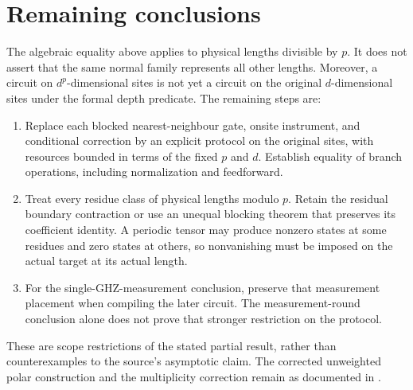 \documentclass{article}
\begin{document}
\section{Remaining conclusions}
The algebraic equality above applies to physical lengths divisible by
$p$. It does not assert that the same normal family represents all
other lengths. Moreover, a circuit on $d^p$-dimensional sites is not yet
a circuit on the original $d$-dimensional sites under the formal depth
predicate. The remaining steps are:
\begin{enumerate}
    \item Replace each blocked nearest-neighbour gate, onsite
          instrument, and conditional correction by an explicit
          protocol on the original sites, with resources bounded in
          terms of the fixed $p$ and $d$. Establish equality of branch
          operations, including normalization and feedforward.
    \item Treat every residue class of physical lengths modulo $p$.
          Retain the residual boundary contraction or use an unequal
          blocking theorem that preserves its coefficient identity.
          A periodic tensor may produce nonzero states at some
          residues and zero states at others, so nonvanishing must be
          imposed on the actual target at its actual length.
    \item For the single-GHZ-measurement conclusion, preserve that
          measurement placement when compiling the later circuit.
          The measurement-round conclusion alone does not prove that
          stronger restriction on the protocol.
\end{enumerate}
These are scope restrictions of the stated partial result, rather than
counterexamples to the source's asymptotic claim. The corrected unweighted
polar construction and the multiplicity correction remain as documented in
\cite{gap:mswc24_measurement_preparation_scope,gap:mswc24_multiplicity_fixed_point}.



\end{document}
